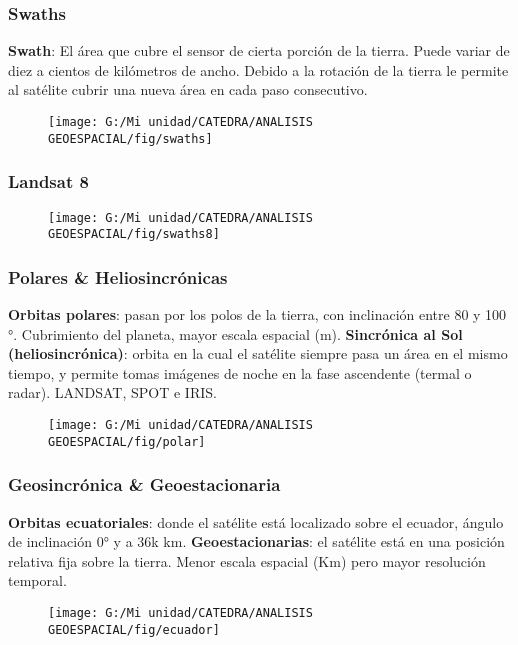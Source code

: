 \documentclass[14pt]{beamer}
\begin{document}
\begin{frame}
\frametitle{Swaths} 
\scriptsize{
\textbf{Swath}: El área que cubre el sensor de cierta porción de la tierra. Puede variar de diez a cientos de kilómetros de ancho. Debido a la rotación de la tierra le permite al satélite cubrir una nueva área en cada paso consecutivo.
}
 \begin{figure}
    \centering
    \texttt{[image: G:/Mi unidad/CATEDRA/ANALISIS GEOESPACIAL/fig/swaths]}
  \end{figure}
\end{frame}
\begin{frame}
\frametitle{Landsat 8}
 \begin{figure}
    \centering
    \texttt{[image: G:/Mi unidad/CATEDRA/ANALISIS GEOESPACIAL/fig/swaths8]}
  \end{figure}
\end{frame}
 \begin{frame}
\frametitle{Polares \& Heliosincrónicas}
\scriptsize{
\textbf{Orbitas polares}: pasan por los polos de la tierra, con inclinación entre 80 y 100 °. Cubrimiento del planeta, mayor escala espacial (m).\vfill
\textbf{Sincrónica al Sol (heliosincrónica)}: orbita en la cual el satélite siempre pasa un área en el mismo tiempo, y permite tomas imágenes de noche en la fase ascendente (termal o radar). LANDSAT, SPOT e IRIS.
}
 \begin{figure}
    \centering
    \texttt{[image: G:/Mi unidad/CATEDRA/ANALISIS GEOESPACIAL/fig/polar]}
  \end{figure}
\end{frame}
 \begin{frame}
\frametitle{Geosincrónica \& Geoestacionaria}
\scriptsize{
\textbf{Orbitas ecuatoriales}: donde el satélite está localizado sobre el ecuador, ángulo de inclinación 0° y a 36k km.\vfill
\textbf{Geoestacionarias}: el satélite está en una posición relativa fija sobre la tierra. Menor escala espacial (Km) pero mayor resolución temporal.
}
 \begin{figure}
    \centering
    \texttt{[image: G:/Mi unidad/CATEDRA/ANALISIS GEOESPACIAL/fig/ecuador]}
  \end{figure}
\end{frame}
\end{document}
